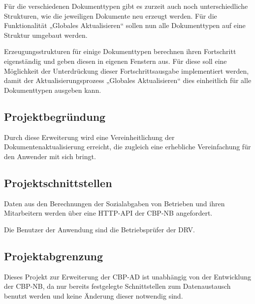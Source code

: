 Für die verschiedenen Dokumenttypen gibt es zurzeit auch noch unterschiedliche Strukturen, wie die jeweiligen Dokumente neu erzeugt werden. Für die Funktionalität „Globales Aktualisieren“ sollen nun alle Dokumenttypen auf eine Struktur umgebaut werden.

Erzeugungsstrukturen für einige Dokumenttypen berechnen ihren Fortschritt eigenständig und geben diesen in eigenen Fenstern aus. Für diese soll eine Möglichkeit der Unterdrückung dieser Fortschrittsausgabe implementiert werden, damit der Aktualisierungsprozess „Globales Aktualisieren“ dies einheitlich für alle Dokumenttypen ausgeben kann.


\subsection{Projektbegründung} 
\label{sec:Projektbegruendung}

Durch diese Erweiterung wird eine Vereinheitlichung der Dokumentenaktualisierung erreicht, die zugleich eine erhebliche Vereinfachung für den Anwender mit sich bringt.


\subsection{Projektschnittstellen} 
\label{sec:Projektschnittstellen}

Daten aus den Berechnungen der Sozialabgaben von Betrieben und ihren Mitarbeitern werden über eine \acs{HTTP}-\acs{API} der \acs{CBP-NB} angefordert.

Die Benutzer der Anwendung sind die Betriebsprüfer der \acs{DRV}.


\subsection{Projektabgrenzung} 
\label{sec:Projektabgrenzung}

Dieses Projekt zur Erweiterung der \acs{CBP-AD} ist unabhängig von der Entwicklung der \ac{CBP-NB}, da nur bereits festgelegte Schnittstellen zum Datenaustausch benutzt werden und keine Änderung dieser notwendig sind.



